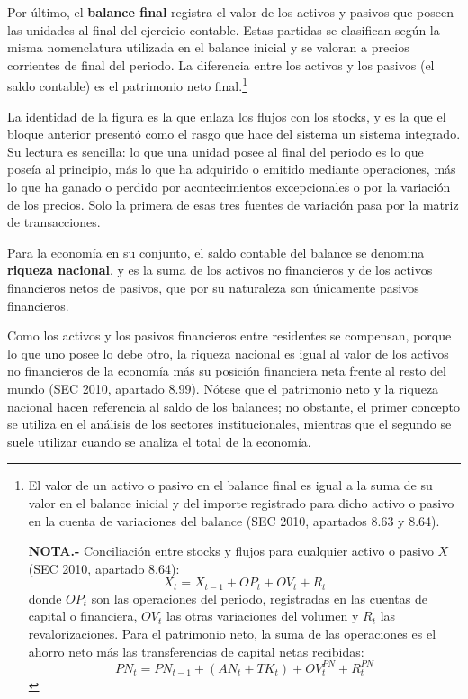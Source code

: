 \documentclass[10pt,a4paper]{article}
\begin{document}
Por último, el \textbf{balance final} registra el valor de los activos y pasivos que poseen las unidades al final del ejercicio contable. Estas partidas se clasifican según la misma nomenclatura utilizada en el balance inicial y se valoran a precios corrientes de final del periodo. La diferencia entre los activos y los pasivos (el saldo contable) es el patrimonio neto final.\footnote{%
    El valor de un activo o pasivo en el balance final es igual a la suma de su valor en el balance inicial y del importe registrado para dicho activo o pasivo en la cuenta de variaciones del balance (SEC 2010, apartados 8.63 y 8.64).

    \textbf{NOTA.-} Conciliación entre stocks y flujos para cualquier activo o pasivo $X$ (SEC 2010, apartado 8.64):
    $$X_t=X_{t-1}+OP_t+OV_t+R_t$$
    donde $OP_t$ son las operaciones del periodo, registradas en las cuentas de capital o financiera, $OV_t$ las otras variaciones del volumen y $R_t$ las revalorizaciones. Para el patrimonio neto, la suma de las operaciones es el ahorro neto más las transferencias de capital netas recibidas:
    $$PN_t=PN_{t-1}+\left(AN_t+TK_t\right)+OV^{PN}_t+R^{PN}_t$$
}

La identidad de la figura es la que enlaza los flujos con los stocks, y es la que el bloque anterior presentó como el rasgo que hace del sistema un sistema integrado. Su lectura es sencilla: lo que una unidad posee al final del periodo es lo que poseía al principio, más lo que ha adquirido o emitido mediante operaciones, más lo que ha ganado o perdido por acontecimientos excepcionales o por la variación de los precios. Solo la primera de esas tres fuentes de variación pasa por la matriz de transacciones.

Para la economía en su conjunto, el saldo contable del balance se denomina \textbf{riqueza nacional}, y es la suma de los activos no financieros y de los activos financieros netos de pasivos, que por su naturaleza son únicamente pasivos financieros. 

Como los activos y los pasivos financieros entre residentes se compensan, porque lo que uno posee lo debe otro, la riqueza nacional es igual al valor de los activos no financieros de la economía más su posición financiera neta frente al resto del mundo (SEC 2010, apartado 8.99). Nótese que el patrimonio neto y la riqueza nacional hacen referencia al saldo de los balances; no obstante, el primer concepto se utiliza en el análisis de los sectores institucionales, mientras que el segundo se suele utilizar cuando se analiza el total de la economía.
\end{document}
